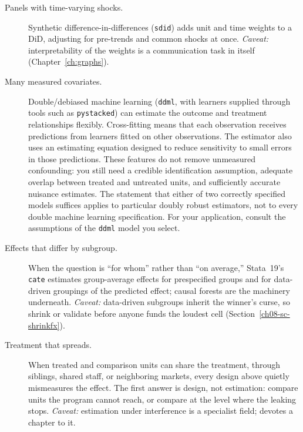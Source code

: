 \documentclass[
    a4paper,
    fontsize=10pt,
    twoside=true,
    numbers=noenddot,
]{kaobook}
\begin{document}
\begin{description}
    \item[Panels with time-varying shocks.] Synthetic difference-in-differences (\texttt{sdid}) adds unit and time weights to a DiD, adjusting for pre-trends and common shocks at once. \emph{Caveat:} interpretability of the weights is a communication task in itself (Chapter~\ref{ch:graphs}).
    \item[Many measured covariates.] Double/debiased machine learning (\texttt{ddml}, with learners supplied through tools such as \texttt{pystacked}) can estimate the outcome and treatment relationships flexibly. Cross-fitting means that each observation receives predictions from learners fitted on other observations. The estimator also uses an estimating equation designed to reduce sensitivity to small errors in those predictions. These features do not remove unmeasured confounding: you still need a credible identification assumption, adequate overlap between treated and untreated units, and sufficiently accurate nuisance estimates. The statement that either of two correctly specified models suffices applies to particular doubly robust estimators, not to every double machine learning specification. For your application, consult the assumptions of the \texttt{ddml} model you select.
    \item[Effects that differ by subgroup.] When the question is \enquote{for whom} rather than \enquote{on average,} Stata~19's \texttt{cate} estimates group-average effects for prespecified groups and for data-driven groupings of the predicted effect; causal forests \parencite{wager2018forests} are the machinery underneath. \emph{Caveat:} data-driven subgroups inherit the winner's curse, so shrink or validate before anyone funds the loudest cell (Section~\ref{ch08-sc-shrinkfx}).
    \item[Treatment that spreads.] When treated and comparison units can share the treatment, through siblings, shared staff, or neighboring markets, every design above quietly mismeasures the effect. The first answer is design, not estimation: compare units the program cannot reach, or compare at the level where the leaking stops. \emph{Caveat:} estimation under interference is a specialist field; \textcite{huber2023causal} devotes a chapter to it.
\end{description}
\end{document}
